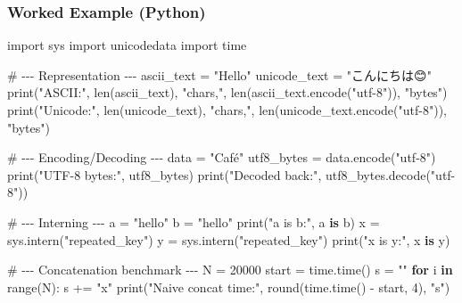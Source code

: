 \documentclass[
  letterpaper,
  DIV=11,
  numbers=noendperiod]{scrreprt}
\newenvironment{Shaded}{\begin{snugshade}}{\end{snugshade}}
\newcommand{\BuiltInTok}[1]{\textcolor[rgb]{0.00,0.23,0.31}{#1}}
\newcommand{\CommentTok}[1]{\textcolor[rgb]{0.37,0.37,0.37}{#1}}
\newcommand{\ControlFlowTok}[1]{\textcolor[rgb]{0.00,0.23,0.31}{\textbf{#1}}}
\newcommand{\DecValTok}[1]{\textcolor[rgb]{0.68,0.00,0.00}{#1}}
\newcommand{\ImportTok}[1]{\textcolor[rgb]{0.00,0.46,0.62}{#1}}
\newcommand{\KeywordTok}[1]{\textcolor[rgb]{0.00,0.23,0.31}{\textbf{#1}}}
\newcommand{\NormalTok}[1]{\textcolor[rgb]{0.00,0.23,0.31}{#1}}
\newcommand{\OperatorTok}[1]{\textcolor[rgb]{0.37,0.37,0.37}{#1}}
\newcommand{\StringTok}[1]{\textcolor[rgb]{0.13,0.47,0.30}{#1}}
\begin{document}
\subsubsection{Worked Example (Python)}\label{worked-example-python-6}

\begin{Shaded}
\begin{Highlighting}[]
\ImportTok{import}\NormalTok{ sys}
\ImportTok{import}\NormalTok{ unicodedata}
\ImportTok{import}\NormalTok{ time}

\CommentTok{\# {-}{-}{-} Representation {-}{-}{-}}
\NormalTok{ascii\_text }\OperatorTok{=} \StringTok{"Hello"}
\NormalTok{unicode\_text }\OperatorTok{=} \StringTok{"こんにちは😊"}
\BuiltInTok{print}\NormalTok{(}\StringTok{"ASCII:"}\NormalTok{, }\BuiltInTok{len}\NormalTok{(ascii\_text), }\StringTok{"chars,"}\NormalTok{, }\BuiltInTok{len}\NormalTok{(ascii\_text.encode(}\StringTok{"utf{-}8"}\NormalTok{)), }\StringTok{"bytes"}\NormalTok{)}
\BuiltInTok{print}\NormalTok{(}\StringTok{"Unicode:"}\NormalTok{, }\BuiltInTok{len}\NormalTok{(unicode\_text), }\StringTok{"chars,"}\NormalTok{, }\BuiltInTok{len}\NormalTok{(unicode\_text.encode(}\StringTok{"utf{-}8"}\NormalTok{)), }\StringTok{"bytes"}\NormalTok{)}

\CommentTok{\# {-}{-}{-} Encoding/Decoding {-}{-}{-}}
\NormalTok{data }\OperatorTok{=} \StringTok{"Café"}
\NormalTok{utf8\_bytes }\OperatorTok{=}\NormalTok{ data.encode(}\StringTok{"utf{-}8"}\NormalTok{)}
\BuiltInTok{print}\NormalTok{(}\StringTok{"UTF{-}8 bytes:"}\NormalTok{, utf8\_bytes)}
\BuiltInTok{print}\NormalTok{(}\StringTok{"Decoded back:"}\NormalTok{, utf8\_bytes.decode(}\StringTok{"utf{-}8"}\NormalTok{))}

\CommentTok{\# {-}{-}{-} Interning {-}{-}{-}}
\NormalTok{a }\OperatorTok{=} \StringTok{"hello"}
\NormalTok{b }\OperatorTok{=} \StringTok{"hello"}
\BuiltInTok{print}\NormalTok{(}\StringTok{"a is b:"}\NormalTok{, a }\KeywordTok{is}\NormalTok{ b)}
\NormalTok{x }\OperatorTok{=}\NormalTok{ sys.}\BuiltInTok{intern}\NormalTok{(}\StringTok{"repeated\_key"}\NormalTok{)}
\NormalTok{y }\OperatorTok{=}\NormalTok{ sys.}\BuiltInTok{intern}\NormalTok{(}\StringTok{"repeated\_key"}\NormalTok{)}
\BuiltInTok{print}\NormalTok{(}\StringTok{"x is y:"}\NormalTok{, x }\KeywordTok{is}\NormalTok{ y)}

\CommentTok{\# {-}{-}{-} Concatenation benchmark {-}{-}{-}}
\NormalTok{N }\OperatorTok{=} \DecValTok{20000}
\NormalTok{start }\OperatorTok{=}\NormalTok{ time.time()}
\NormalTok{s }\OperatorTok{=} \StringTok{""}
\ControlFlowTok{for}\NormalTok{ i }\KeywordTok{in} \BuiltInTok{range}\NormalTok{(N):}
\NormalTok{    s }\OperatorTok{+=} \StringTok{"x"}
\BuiltInTok{print}\NormalTok{(}\StringTok{"Naive concat time:"}\NormalTok{, }\BuiltInTok{round}\NormalTok{(time.time() }\OperatorTok{{-}}\NormalTok{ start, }\DecValTok{4}\NormalTok{), }\StringTok{"s"}\NormalTok{)}


\end{Highlighting}
\end{Shaded}
\end{document}
